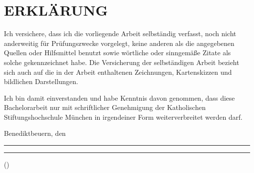 \chapter*{ERKLÄRUNG}
\thispagestyle{empty}

Ich versichere, dass ich die vorliegende Arbeit selbständig verfasst, noch nicht anderweitig für Prüfungszwecke vorgelegt, keine anderen als die angegebenen Quellen oder Hilfsmittel benutzt sowie wörtliche oder sinngemäße Zitate als solche gekennzeichnet habe. Die Versicherung der selbständigen Arbeit bezieht sich auch auf die in der Arbeit enthaltenen Zeichnungen, Kartenskizzen und bildlichen Darstellungen.

Ich bin damit einverstanden und habe Kenntnis davon genommen, dass diese Bachelorarbeit nur mit schriftlicher Genehmigung der Katholischen Stiftungshochschule München in irgendeiner Form weiterverbreitet werden darf.

\vspace{3cm}

\noindent
Benediktbeuern, den \rule{4cm}{0.4pt} \hfill \rule{5cm}{0.4pt}

\noindent
\hfill (\thesisauthor)
